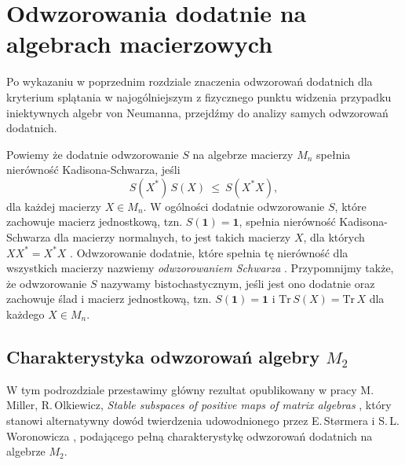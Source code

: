 \chapter{Odwzorowania dodatnie na algebrach macierzowych}
\label{chp:M3notes}

Po wykazaniu w poprzednim rozdziale znaczenia odwzorowań dodatnich dla kryterium
splątania w najogólniejszym z fizycznego punktu widzenia przypadku
iniektywnych algebr von Neumanna, przejdźmy do analizy samych odwzorowań dodatnich.

Powiemy że dodatnie odwzorowanie $S$ na algebrze macierzy $M_{n}$ spełnia nierówność
Kadisona-Schwarza, jeśli
\begin{equation}
\label{eq:SchwarzInequality}
    S(X^{*}) \, S(X) \: \leq \: S(X^{*} X),
\end{equation}
dla każdej macierzy $X \in M_{n}$.
W ogólności dodatnie odwzorowanie $S$, które zachowuje macierz jednostkową,
tzn. $S(\mathbf{1}) = \mathbf{1}$,
spełnia nierówność Kadisona-Schwarza dla macierzy normalnych,
to jest takich macierzy
$X$, dla których  $X X^{*} = X^{*} X$
\cite{choi1980some}.
Odwzorowanie dodatnie, które spełnia tę nierówność dla wszystkich macierzy
nazwiemy \emph{odwzorowaniem Schwarza} \cite{robertson1983schwarz}.
Przypomnijmy także, że odwzorowanie $S$ nazywamy bistochastycznym,
jeśli jest ono dodatnie oraz zachowuje ślad i macierz jednostkową,
tzn.
$S(\mathbf{1}) = \mathbf{1}$
i
$\text{Tr} \, S(X) = \text{Tr} \, X$
dla każdego $X \in M_{n}$.


\section{Charakterystyka odwzorowań algebry $M_{2}$}
\label{sec:M2notes}

W tym podrozdziale przestawimy główny rezultat opublikowany w pracy
M.\,Miller, R.\,Olkiewicz, \emph{Stable subspaces of positive maps of matrix algebras}
\cite{miller2015stable},
który stanowi alternatywny dowód twierdzenia udowodnionego przez
E.\,St{\o}rmera \cite{stormer1963positive}
i S.\,L.\,Woronowicza \cite{woronowicz1976positive},
podającego pełną charakterystykę odwzorowań dodatnich na algebrze $M_{2}$.

